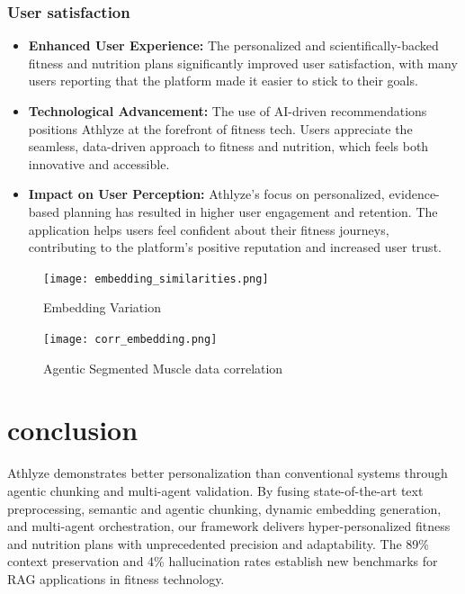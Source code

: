 \documentclass[conference]{IEEEtran}
\begin{document}
\subsubsection{User satisfaction}

\begin{itemize}
    \item \textbf{Enhanced User Experience:} The personalized and scientifically-backed fitness and nutrition plans significantly improved user satisfaction, with many users reporting that the platform made it easier to stick to their goals.
    \item \textbf{Technological Advancement:} The use of AI-driven recommendations positions Athlyze at the forefront of fitness tech. Users appreciate the seamless, data-driven approach to fitness and nutrition, which feels both innovative and accessible.
    \item \textbf{Impact on User Perception:} Athlyze's focus on personalized, evidence-based planning has resulted in higher user engagement and retention. The application helps users feel confident about their fitness journeys, contributing to the platform's positive reputation and increased user trust.
\end{itemize}

\begin{figure}[h!]
    \centering
    \texttt{[image: embedding\_similarities.png]}
    \caption{Embedding Variation}
    \label{fig:RAG}
\end{figure}

\begin{figure}[h!]
    \centering
    \texttt{[image: corr\_embedding.png]}
    \caption{Agentic Segmented Muscle data correlation}
    \label{fig:RAG}
\end{figure}

\section{conclusion}
Athlyze demonstrates better personalization than conventional systems through agentic chunking and multi-agent validation. By fusing state-of-the-art text preprocessing, semantic and agentic chunking, dynamic embedding generation, and multi-agent orchestration, our framework delivers hyper-personalized fitness and nutrition plans with unprecedented precision and adaptability. The 89\% context preservation and 4\% hallucination rates establish new benchmarks for RAG applications in fitness technology.
\end{document}
